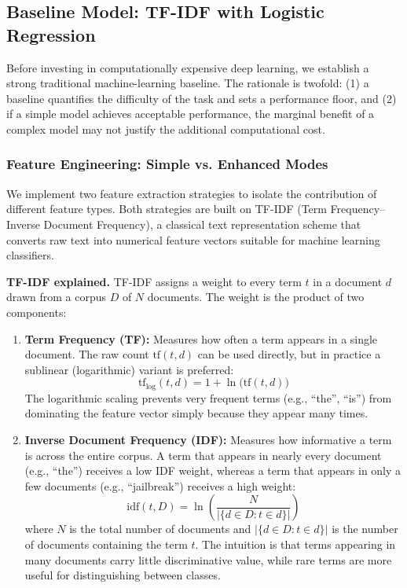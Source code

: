 \documentclass[12pt, letterpaper]{article}   %
\begin{document}
\subsection{Baseline Model: TF-IDF with Logistic Regression}

Before investing in computationally expensive deep learning, we establish a strong traditional machine-learning baseline. The rationale is twofold: (1) a baseline quantifies the difficulty of the task and sets a performance floor, and (2) if a simple model achieves acceptable performance, the marginal benefit of a complex model may not justify the additional computational cost.

\subsubsection{Feature Engineering: Simple vs. Enhanced Modes}

We implement two feature extraction strategies to isolate the contribution of different feature types. Both strategies are built on TF-IDF (Term Frequency--Inverse Document Frequency), a classical text representation scheme that converts raw text into numerical feature vectors suitable for machine learning classifiers.

\textbf{TF-IDF explained.} TF-IDF assigns a weight to every term $t$ in a document $d$ drawn from a corpus $D$ of $N$ documents. The weight is the product of two components:

\begin{enumerate}
    \item \textbf{Term Frequency (TF):} Measures how often a term appears in a single document. The raw count $\text{tf}(t, d)$ can be used directly, but in practice a sublinear (logarithmic) variant is preferred:
    \[
        \text{tf}_{\log}(t, d) = 1 + \ln\bigl(\text{tf}(t, d)\bigr)
    \]
    The logarithmic scaling prevents very frequent terms (e.g., ``the'', ``is'') from dominating the feature vector simply because they appear many times.

    \item \textbf{Inverse Document Frequency (IDF):} Measures how informative a term is across the entire corpus. A term that appears in nearly every document (e.g., ``the'') receives a low IDF weight, whereas a term that appears in only a few documents (e.g., ``jailbreak'') receives a high weight:
    \[
        \text{idf}(t, D) = \ln\!\left(\frac{N}{|\{d \in D : t \in d\}|}\right)
    \]
    where $N$ is the total number of documents and $|\{d \in D : t \in d\}|$ is the number of documents containing the term $t$. The intuition is that terms appearing in many documents carry little discriminative value, while rare terms are more useful for distinguishing between classes.
\end{enumerate}
\end{document}
